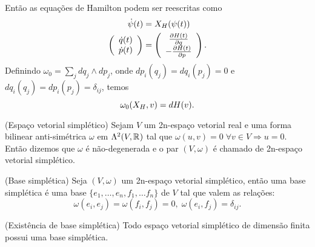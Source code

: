 \documentclass{beamer}
\begin{document}
\begin{frame}
	 Então as equações de Hamilton podem ser reescritas como 
	 $$
	 \begin{aligned}
	 \dot{\psi}(t) &= X_{H}(\psi(t))
	 \\
	 \left(
	 \begin{array}{c}
	 \dot{q}(t)
	 \\
	 \dot{p}(t)
	 \end{array}
	 \right)
	 &=
	 \left(
	 \begin{array}{c}
	 \frac{\partial H(t)}{\partial q}
	 \\
	 -\frac{\partial H(t)}{\partial p}
	 \end{array}
	 \right).
	 \end{aligned}
	 $$
	 Definindo $\omega_{0}= \sum_{j}  dq_{j}\wedge dp_{j}$, onde $dp_{i}(q_{j}) = dq_{i}(p_{j}) = 0$ e $dq_{i}(q_{j}) = dp_{i}(p_{j}) = \delta_{ij}$, temos
	 $$
	 \omega_{0}(X_{H}, v) = dH(v).
	 $$
	 
\end{frame}

\begin{frame}
	\begin{definicao}
		(Espaço vetorial simplético) Sejam $V$ um 2n-espaço vetorial real e uma forma bilinear anti-simétrica $\omega$ em $\Lambda^{2}(V, \mathbb{R}^{})$ tal que $\omega(u,v) = 0 \; \forall v \in V \Rightarrow u=0$. Então dizemos que $\omega$ é não-degenerada e o par $(V, \omega)$ é chamado de 2n-espaço vetorial simplético.
	\end{definicao}
	\begin{definicao}
		(Base simplética) Seja $(V, \omega)$ um 2n-espaço vetorial simplético, então uma base simplética é uma base $\{ e_{1},\dots, e_{n},f_{1},\dots f_{n}\}$ de $V$ tal que valem as relações:
		$$
		\omega(e_{i}, e_{j}) = \omega(f_{i}, f_{j}) = 0, \; \omega(e_{i}, f_{j}) = \delta_{ij}.
		$$
	\end{definicao}
	\begin{teorema}
		(Existência de base simplética) Todo espaço vetorial simplético de dimensão finita possui uma base simplética.
	\end{teorema}
\end{frame}
\end{document}
